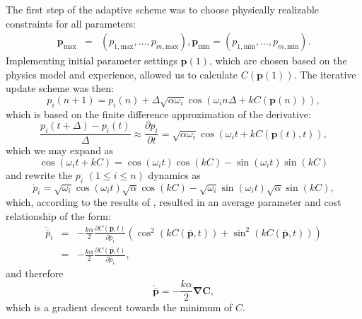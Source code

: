 \documentclass[%
twocolumn,
showpacs,preprintnumbers,
 aps,
prstab,
]{revtex4-1}
\begin{document}
The first step of the adaptive scheme was to choose physically realizable constraints for all parameters:
\begin{eqnarray}
	\mathbf{p}_{\mathrm{max}} &=& \left ( p_{1,\mathrm{max}}, \dots, p_{m,\mathrm{max}} \right ), \mathbf{p}_{\mathrm{min}} = \left (  p_{1,\mathrm{min}}, \dots, p_{m,\mathrm{min}} \right ). \nonumber
\end{eqnarray}
Implementing initial parameter settings $\mathbf{p}(1)$, which are chosen based on the physics model and experience, allowed us to calculate $C(\mathbf{p}(1))$. The iterative update scheme was then:
\begin{equation}
	p_i(n+1) = p_i(n) + \Delta \sqrt{\alpha\omega_i}\cos \left ( \omega_i n \Delta + k C(\mathbf{p}(n)) \right ), \label{ESschm}
\end{equation}
which is based on the finite difference approximation of the derivative:
\begin{equation}
	\frac{p_i(t+\Delta)-p_i(t)}{\Delta} \approx \frac{\partial p_i}{\partial t} = \sqrt{\alpha\omega_i}\cos \left ( \omega_i t + k C(\mathbf{p}(t),t) \right ), \label{ESschmdr}
\end{equation}
which we may expand as
\begin{equation}
\cos \left (\omega_i t + kC \right ) = \cos(\omega_i t)\cos\left (kC \right ) - \sin \left (\omega_i t \right )\sin \left (kC \right )
\end{equation}
and rewrite the $p_{i}$ $\left ( 1 \leq i \leq n \right )$ dynamics as
\begin{equation}
	\dot{p}_{i} = \sqrt{\omega_i}\cos(\omega_i t)\sqrt{\alpha}\cos \left (k C \right )  -\sqrt{\omega_i}\sin(\omega_i t)\sqrt{\alpha}\sin\left (k C \right),
\end{equation}
which, according to the results of \cite{ref-stab-sch}, resulted in an average parameter and cost relationship of the form:
\begin{eqnarray}
	\dot{\bar{p}}_{i} &=& -\frac{k \alpha}{2} \frac{\partial C\left ( \bar{\mathbf{p}},t\right )}{\partial \bar{p}_{i}}\left ( \cos^2 \left (k C\left ( \bar{\mathbf{p}},t\right ) \right ) + \sin^2 \left (k C\left ( \bar{\mathbf{p}},t\right ) \right ) \right ) \nonumber \\
	&=& -\frac{k \alpha}{2} \frac{\partial C\left ( \bar{\mathbf{p}},t\right )}{\partial \bar{p}_{i}},
\end{eqnarray}
and therefore
\begin{equation}
	\dot{\bar{\mathbf{p}}} = -\frac{k \alpha}{2} \mathbf{\nabla C},
\end{equation}
which is a gradient descent towards the minimum of $C$.
\end{document}
